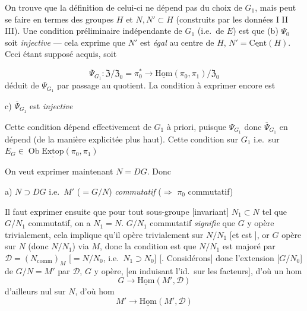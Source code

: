 \documentclass[11pt,a4paper]{article}
\begin{document}
On trouve que la définition de celui-ci ne dépend pas du choix de $G_1$, mais peut se faire en termes des groupes $H$ et $N, N' \subset H$ (construits par les données I II III). Une condition préliminaire indépendante de $G_1$ (i.e.\ de $E$) est que (b) $\Psi_0$ soit \emph{injective} --- cela exprime que $N'$ est \emph{égal} au centre de $H$, $N' = \underline{\mathrm{Cent}}(H)$. Ceci étant supposé acquis,  soit

\[
  \overline{\Psi}_{G_1} \colon \mathfrak{Z}/\mathfrak{Z}_0 = \pi_0^{*} \longrightarrow \underline{\mathrm{Hom}}(\pi_0, \pi_1)/\mathfrak{Z}_0
\]
déduit de $\Psi_{G_1}$ par passage au quotient. La condition à exprimer encore est

c) $\overline{\Psi}_{G_1}$ est \emph{injective}

Cette condition dépend effectivement de $G_1$ à priori, puisque $\Psi_{G_1}$ donc $\overline{\Psi}_{G_1}$ en dépend (de la manière explicitée plus haut). Cette condition sur $G_1$ i.e.\ sur $E_G \in \operatorname{Ob}\underline{\mathrm{Extop}}(\pi_0, \pi_1)$

On veut exprimer maintenant $N = DG$. Donc

a) $N \supset DG$ i.e.\ $M'$ ($= G/N$) \emph{commutatif} ($\Longrightarrow$ $\pi_0$ commutatif)

Il faut exprimer ensuite que pour tout sous-groupe [invariant] $N_1 \subset N$ tel que $G/N_1$ commutatif, on a $N_1 = N$. $G/N_1$ commutatif \emph{signifie} que $G$ y opère trivialement, %
cela implique qu'il opère trivialement sur $N/N_1$ [et  \ill{} est ], or $G$ opère sur $N$ (donc $N/N_1$) via $M$, donc la condition est que \struck{\ill{}} $N/N_1$ est majoré par $\mathcal{D} = (N_{\mathrm{comm}})_{M}$ [$= N/N_0$, i.e.\ $N_1 \supset N_0$] [. Considérons] donc l'extension [$G/N_0$] de $G/N = M'$ par $\mathcal{D}$, $G$ y opère, [en induisant l'id.\ sur les facteurs], d'où un hom
\[
  G \longrightarrow \underline{\mathrm{Hom}}(M', \mathcal{D})
\]
d'ailleurs nul sur $N$, d'où hom
\[
  M' \longrightarrow \underline{\mathrm{Hom}}(M', \mathcal{D})
\]
\end{document}
